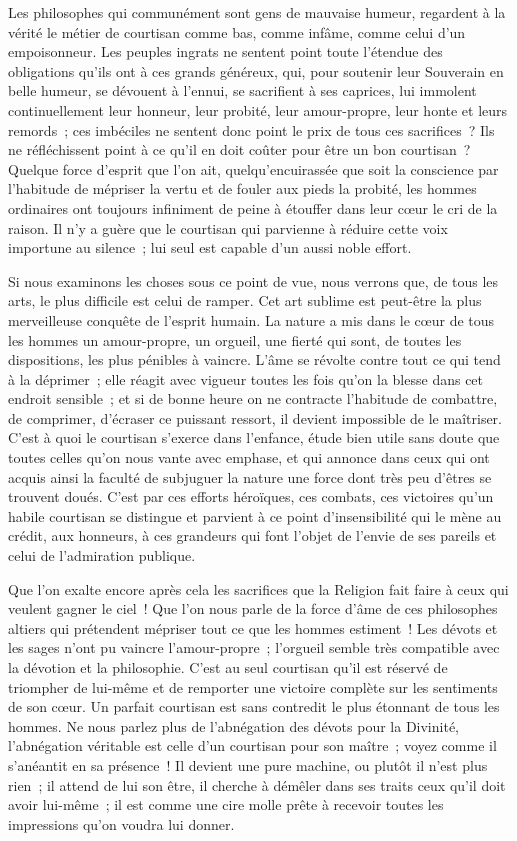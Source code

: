 \documentclass[french,twoside]{book} %
\begin{document}
Les philosophes qui communément sont gens de mauvaise humeur, regardent à la vérité le métier de courtisan comme bas, comme infâme, comme celui d’un empoisonneur. Les peuples ingrats ne sentent point toute l’étendue des obligations qu’ils ont à ces grands généreux, qui, pour soutenir leur Souverain en belle humeur, se dévouent à l’ennui, se sacrifient à ses caprices, lui immolent continuellement leur honneur, leur probité, leur amour-propre, leur honte et leurs remords ; ces imbéciles ne sentent donc point le prix de tous ces sacrifices ? Ils ne réfléchissent point à ce qu’il en doit coûter pour être un bon courtisan ? Quelque force d’esprit que l’on ait, quelqu’encuirassée que soit la conscience par l’habitude de mépriser la vertu et de fouler aux pieds la probité, les hommes ordinaires ont toujours infiniment de peine à étouffer dans leur cœur le cri de la raison. Il n’y a guère que le courtisan qui parvienne à réduire cette voix importune au silence ; lui seul est capable d’un aussi noble effort.\par
Si nous examinons les choses sous ce point de vue, nous verrons que, de tous les arts, le plus difficile est celui de ramper. Cet art sublime est peut-être la plus merveilleuse conquête de l’esprit humain. La nature a mis dans le cœur de tous les hommes un amour-propre, un orgueil, une fierté qui sont, de toutes les dispositions, les plus pénibles à vaincre. L’âme se révolte contre tout ce qui tend à la déprimer ; elle réagit avec vigueur toutes les fois qu’on la blesse dans cet endroit sensible ; et si de bonne heure on ne contracte l’habitude de combattre, de comprimer, d’écraser ce puissant ressort, il devient impossible de le maîtriser. C’est à quoi le courtisan s’exerce dans l’enfance, étude bien utile sans doute que toutes celles qu’on nous vante avec emphase, et qui annonce dans ceux qui ont acquis ainsi la faculté de subjuguer la nature une force dont très peu d’êtres se trouvent doués. C’est par ces efforts héroïques, ces combats, ces victoires qu’un habile courtisan se distingue et parvient à ce point d’insensibilité qui le mène au crédit, aux honneurs, à ces grandeurs qui font l’objet de l’envie de ses pareils et celui de l’admiration publique.\par
Que l’on exalte encore après cela les sacrifices que la Religion fait faire à ceux qui veulent gagner le ciel ! Que l’on nous parle de la force d’âme de ces philosophes altiers qui prétendent mépriser tout ce que les hommes estiment ! Les dévots et les sages n’ont pu vaincre l’amour-propre ; l’orgueil semble très compatible avec la dévotion et la philosophie. C’est au seul courtisan qu’il est réservé de triompher de lui-même et de remporter une victoire complète sur les sentiments de son cœur. Un parfait courtisan est sans contredit le plus étonnant de tous les hommes. Ne nous parlez plus de l’abnégation des dévots pour la Divinité, l’abnégation véritable est celle d’un courtisan pour son maître ; voyez comme il s’anéantit en sa présence ! Il devient une pure machine, ou plutôt il n’est plus rien ; il attend de lui son être, il cherche à démêler dans ses traits ceux qu’il doit avoir lui-même ; il est comme une cire molle prête à recevoir toutes les impressions qu’on voudra lui donner.\par
\end{document}
